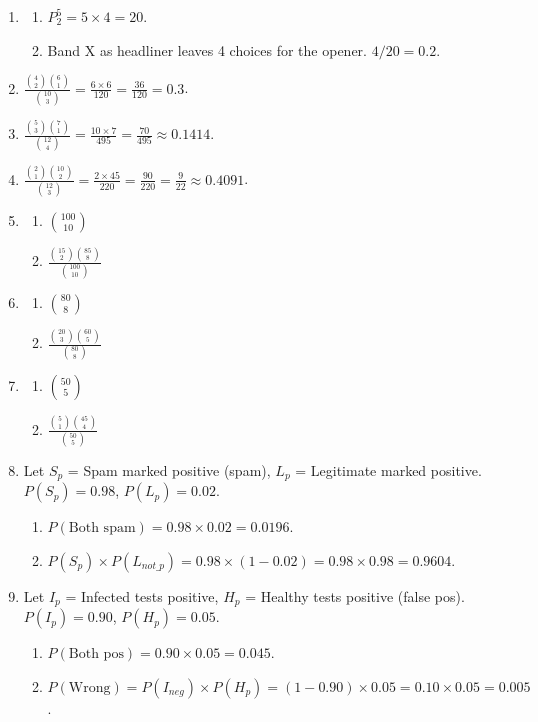 \documentclass[11pt]{article}
\begin{document}
\begin{enumerate}
\item 
\begin{enumerate}
    \item $P_{2}^{5} = 5 \times 4 = 20$.
    \item Band X as headliner leaves 4 choices for the opener. $4/20 = 0.2$.
\end{enumerate}

\item 
$\frac{\binom{4}{2} \binom{6}{1}}{\binom{10}{3}} = \frac{6 \times 6}{120} = \frac{36}{120} = 0.3$.

\item 
$\frac{\binom{5}{3} \binom{7}{1}}{\binom{12}{4}} = \frac{10 \times 7}{495} = \frac{70}{495} \approx 0.1414$.

\item 
$\frac{\binom{2}{1} \binom{10}{2}}{\binom{12}{3}} = \frac{2 \times 45}{220} = \frac{90}{220} = \frac{9}{22} \approx 0.4091$.

\item 
\begin{enumerate}
    \item $\binom{100}{10}$
    \item $\frac{\binom{15}{2} \binom{85}{8}}{\binom{100}{10}}$
\end{enumerate}

\item 
\begin{enumerate}
    \item $\binom{80}{8}$
    \item $\frac{\binom{20}{3} \binom{60}{5}}{\binom{80}{8}}$
\end{enumerate}

\item 
\begin{enumerate}
    \item $\binom{50}{5}$
    \item $\frac{\binom{5}{1} \binom{45}{4}}{\binom{50}{5}}$
\end{enumerate}

\item 
Let $S_p$ = Spam marked positive (spam), $L_p$ = Legitimate marked positive. 
$P(S_p) = 0.98$, $P(L_p) = 0.02$.
\begin{enumerate}
    \item $P(\text{Both spam}) = 0.98 \times 0.02 = 0.0196$.
    \item $P(S_p) \times P(L_{not\_p}) = 0.98 \times (1 - 0.02) = 0.98 \times 0.98 = 0.9604$.
\end{enumerate}

\item 
Let $I_p$ = Infected tests positive, $H_p$ = Healthy tests positive (false pos).
$P(I_p) = 0.90$, $P(H_p) = 0.05$.
\begin{enumerate}
    \item $P(\text{Both pos}) = 0.90 \times 0.05 = 0.045$.
    \item $P(\text{Wrong}) = P(I_{neg}) \times P(H_p) = (1 - 0.90) \times 0.05 = 0.10 \times 0.05 = 0.005$.
\end{enumerate}

\end{enumerate}
\end{document}
